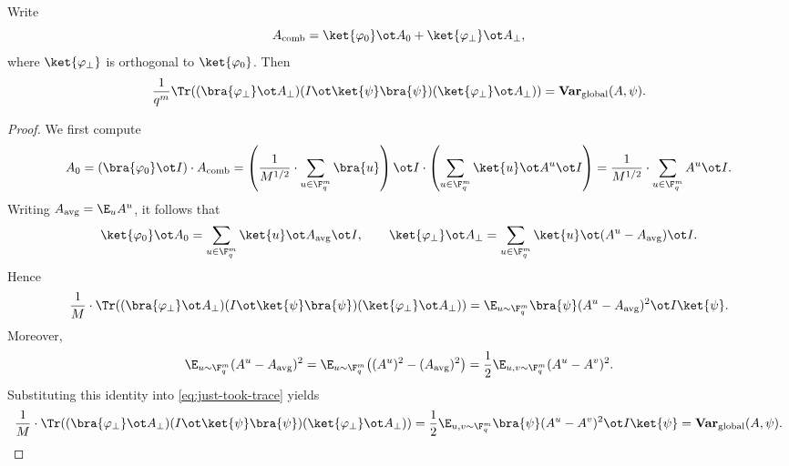 \begin{lemma}\label{lem:global-rewrite}
	\leanok
	Write
	\[
		A_{\mathrm{comb}} = \ket{\varphi_0} \ot A_0 + \ket{\varphi_\perp} \ot A_\perp,
	\]
	where $\ket{\varphi_\perp}$ is orthogonal to $\ket{\varphi_0}$. Then
	\[
		\frac{1}{q^m}\Tr((\bra{\varphi_\perp}\ot A_\perp)(I\ot \ket{\psi}\bra{\psi})(\ket{\varphi_\perp}\ot A_\perp))
		= \mathbf{Var}_{\mathrm{global}}(A,\psi).
	\]
\end{lemma}
\begin{proof}
	\leanok
	We first compute
	\[
		A_0
		=
		(\bra{\varphi_0}\ot I)\cdot A_{\mathrm{comb}}
		=
		\left(\frac{1}{M^{1/2}} \cdot \sum_{u \in \F_q^m} \bra{u}\right) \ot I \cdot \left(\sum_{u \in \F_q^m} \ket{u} \ot A^u \ot I\right)
		=
		\frac{1}{M^{1/2}} \cdot \sum_{u \in \F_q^m} A^u \ot I.
	\]
	Writing $A_{\mathrm{avg}}=\E_u A^u$, it follows that
	\[
		\ket{\varphi_0}\ot A_0
		=
		\sum_{u \in \F_q^m} \ket{u} \ot A_{\mathrm{avg}} \ot I,
		\qquad
		\ket{\varphi_\perp}\ot A_\perp
		=
		\sum_{u \in \F_q^m} \ket{u} \ot (A^u-A_{\mathrm{avg}}) \ot I.
	\]
	Hence
	\begin{equation}
		\frac{1}{M} \cdot \Tr((\bra{\varphi_\perp}\ot A_\perp)(I\ot \ket{\psi}\bra{\psi})(\ket{\varphi_\perp}\ot A_\perp))
		=
		\E_{u \sim \F_q^m} \bra{\psi} (A^u-A_{\mathrm{avg}})^2 \ot I \ket{\psi}.
		\label{eq:just-took-trace}
	\end{equation}
	Moreover,
	\[
		\E_{u \sim \F_q^m}(A^u-A_{\mathrm{avg}})^2
		=
		\E_{u \sim \F_q^m}\bigl((A^u)^2-(A_{\mathrm{avg}})^2\bigr)
		=
		\frac12 \E_{u,v \sim \F_q^m} (A^u-A^v)^2.
	\]
	Substituting this identity into \eqref{eq:just-took-trace} yields
	\[
		\frac{1}{M} \cdot \Tr((\bra{\varphi_\perp}\ot A_\perp)(I\ot \ket{\psi}\bra{\psi})(\ket{\varphi_\perp}\ot A_\perp))
		=
		\frac12 \E_{u,v \sim \F_q^m} \bra{\psi} (A^u-A^v)^2 \ot I \ket{\psi}
		=
		\mathbf{Var}_{\mathrm{global}}(A,\psi).
	\]
\end{proof}

